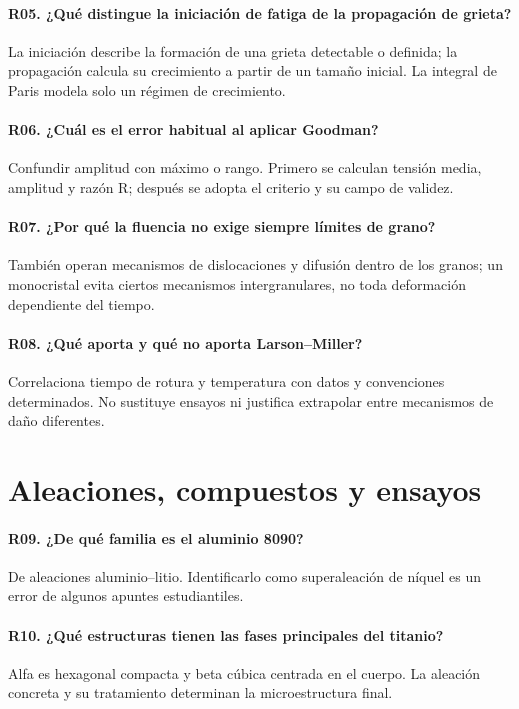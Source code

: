 \paragraph{R05. ¿Qué distingue la iniciación de fatiga de la propagación de grieta?} La iniciación describe la formación de una grieta detectable o definida; la propagación calcula su crecimiento a partir de un tamaño inicial. La integral de Paris modela solo un régimen de crecimiento.

\paragraph{R06. ¿Cuál es el error habitual al aplicar Goodman?} Confundir amplitud con máximo o rango. Primero se calculan tensión media, amplitud y razón R; después se adopta el criterio y su campo de validez.

\paragraph{R07. ¿Por qué la fluencia no exige siempre límites de grano?} También operan mecanismos de dislocaciones y difusión dentro de los granos; un monocristal evita ciertos mecanismos intergranulares, no toda deformación dependiente del tiempo.

\paragraph{R08. ¿Qué aporta y qué no aporta Larson--Miller?} Correlaciona tiempo de rotura y temperatura con datos y convenciones determinados. No sustituye ensayos ni justifica extrapolar entre mecanismos de daño diferentes.

\section{Aleaciones, compuestos y ensayos}

\paragraph{R09. ¿De qué familia es el aluminio 8090?} De aleaciones aluminio--litio. Identificarlo como superaleación de níquel es un error de algunos apuntes estudiantiles.

\paragraph{R10. ¿Qué estructuras tienen las fases principales del titanio?} Alfa es hexagonal compacta y beta cúbica centrada en el cuerpo. La aleación concreta y su tratamiento determinan la microestructura final.

